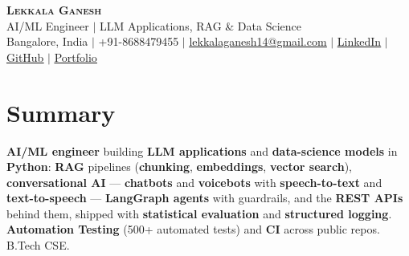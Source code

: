 \documentclass[letterpaper,10pt]{article}
\begin{document}
\begin{center}
    \textbf{\Huge \scshape Lekkala Ganesh} \\ \vspace{2pt}
    \small AI/ML Engineer $|$ LLM Applications, RAG \& Data Science \\ \vspace{2pt}
    \small Bangalore, India $|$ +91-8688479455 $|$
    \href{mailto:lekkalaganesh14@gmail.com}{\underline{lekkalaganesh14@gmail.com}} $|$
    \href{https://linkedin.com/in/lekkala-ganesh}{\underline{LinkedIn}} $|$
    \href{https://github.com/LEKKALAGANESH}{\underline{GitHub}} $|$
    \href{https://lekkalaganesh.vercel.app}{\underline{Portfolio}}
\end{center}

\vspace{-8pt}
\section{Summary}
 \begin{itemize}[leftmargin=0.15in, label={}]
    \small{\item{
     \textbf{AI/ML engineer} building \textbf{LLM applications} and \textbf{data-science models} in
     \textbf{Python}: \textbf{RAG} pipelines (\textbf{chunking}, \textbf{embeddings},
     \textbf{vector search}), \textbf{conversational AI} --- \textbf{chatbots} and \textbf{voicebots}
     with \textbf{speech-to-text} and \textbf{text-to-speech} --- \textbf{LangGraph agents} with
     guardrails, and the \textbf{REST APIs} behind them, shipped with \textbf{statistical evaluation}
     and \textbf{structured logging}. \textbf{Automation Testing} (500+ automated tests) and
     \textbf{CI} across public repos. B.Tech CSE.
    }}
 \end{itemize}

\end{document}
